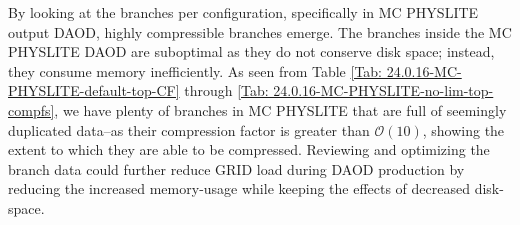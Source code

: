 By looking at the branches per configuration, specifically in MC PHYSLITE output DAOD, highly compressible branches emerge. 
The branches inside the MC PHYSLITE DAOD are suboptimal as they do not conserve disk space; instead, they consume memory inefficiently. 
As seen from Table \ref{Tab: 24.0.16-MC-PHYSLITE-default-top-CF} through \ref{Tab: 24.0.16-MC-PHYSLITE-no-lim-top-compfs}, we have plenty of branches in MC PHYSLITE that are full of seemingly duplicated data--as their compression factor is greater than $\mathcal{O}(10)$, showing the extent to which they are able to be compressed. 
Reviewing and optimizing the branch data could further reduce GRID load during DAOD production by reducing the increased memory-usage while keeping the effects of decreased disk-space. 
